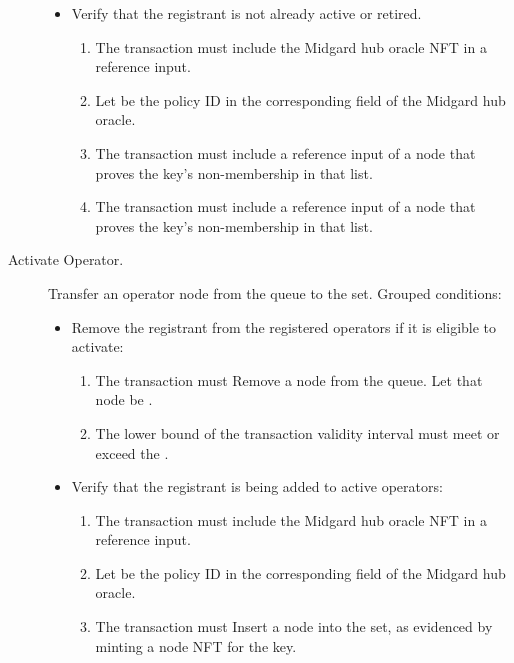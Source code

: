 \documentclass[../midgard.tex]{subfiles}
\begin{document}
\begin{description}
\begin{itemize}
\begin{enumerate}
            \end{enumerate}
            \item Verify that the registrant is not already active or retired.
            \begin{enumerate}[resume]
                \item The transaction must include the Midgard hub oracle NFT in a reference input.
                \item Let  be the policy ID in the corresponding field of the Midgard hub oracle.
                \item The transaction must include a reference input of a  node that proves the  key's non-membership in that list.
                \item The transaction must include a reference input of a  node that proves the  key's non-membership in that list.
            \end{enumerate}
        \end{itemize}
    \item[Activate Operator.] Transfer an operator node from the  queue to the  set.
      Grouped conditions:
        \begin{itemize}
            \item Remove the registrant from the registered operators if it is eligible to activate:
            \begin{enumerate}
                \item The transaction must Remove a node from the  queue.
                  Let that node be .
                \item The lower bound of the transaction validity interval must meet or exceed the .
            \end{enumerate}
            \item Verify that the registrant is being added to active operators:
            \begin{enumerate}[resume]
                \item The transaction must include the Midgard hub oracle NFT in a reference input.
                \item Let  be the policy ID in the corresponding field of the Midgard hub oracle.
                \item The transaction must Insert a node into the  set, as evidenced by minting a  node NFT for the  key.

\end{enumerate}
\end{itemize}
\end{description}
\end{document}
